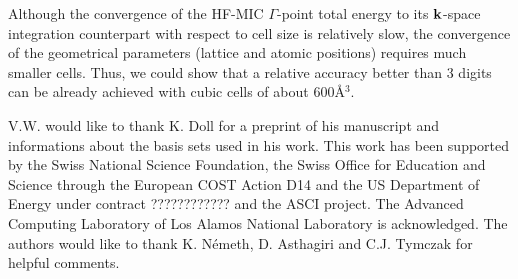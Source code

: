 \documentclass[prl,twocolumn,showpacs,twocolumngrid,superbib]{revtex4}
\begin{document}
Although the convergence of the HF-MIC $\Gamma$-point total energy to 
its ${\bf k}$-space integration counterpart with respect to cell size is relatively slow,
the convergence of the geometrical parameters (lattice and atomic positions)
requires much smaller cells. Thus, we could show that a relative accuracy better
than 3 digits can be already achieved with cubic cells of about $600$\AA$^3$.
\\
\begin{acknowledgments}
 V.W. would like to thank K. Doll for a preprint of his manuscript and informations
 about the basis sets used in his work.
 This work has been supported by the Swiss National Science Foundation, 
 the Swiss Office for Education and Science through the European 
 COST Action D14 and the US Department of Energy 
 under contract ???????????? and the ASCI project.  
 The Advanced Computing Laboratory of Los 
 Alamos National Laboratory is acknowledged.
 The authors would like to thank K. N\'emeth, D. Asthagiri and C.J. Tymczak 
 for helpful comments.
\end{acknowledgments}  

\end{document}

